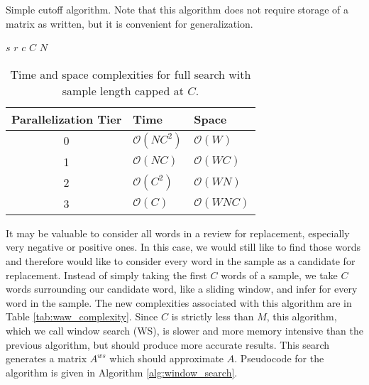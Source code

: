 \begin{algorithm}
\begin{algorithmic}[1]
\begin{spacing}{1.0}
    \caption{Simple cutoff algorithm.  Note that this algorithm does not require storage of a matrix as written, but it is convenient for generalization.}
    \Require $s$ 
    \Require $r$ 
    \Require $c$ 
    \Require $C$ 
    \Require $N$ 
            \EndIf
            \EndIf
        \EndFor
    \EndFor\\
\label{alg:cutoff}
\end{spacing}
\end{algorithmic}
\end{algorithm}

\begin{table}
\centering
\begin{tabular}{ |c|l|l| } 
 \hline
 Parallelization Tier & Time & Space \\ \hline
 0&$\mathcal{O}(NC^2)$ & $\mathcal{O}(W)$ \\ %
 1&$\mathcal{O}(NC)$ & $\mathcal{O}(WC)$ \\ %
 2&$\mathcal{O}(C^2)$ & $\mathcal{O}(WN)$ \\%
 3&$\mathcal{O}(C)$ & $\mathcal{O}(WNC)$ \\ \hline
\end{tabular}
\caption{Time and space complexities for full search with sample length capped at $C$.}
\label{tab:wa_complexity}
\end{table}

It may be valuable to consider all words in a review for replacement, especially very negative or positive ones.  In this case, we would still like to find those words and therefore would like to consider every word in the sample as a candidate for replacement.  Instead of simply taking the first $C$ words of a sample, we take $C$ words surrounding our candidate word, like a sliding window, and infer for every word in the sample.  The new complexities associated with this algorithm are in Table \ref{tab:waw_complexity}.  Since $C$ is strictly less than $M$, this algorithm, which we call window search (WS), is slower and more memory intensive than the previous algorithm, but should produce more accurate results.  This search generates a matrix $A^{ws}$ which should approximate $A$.  Pseudocode for the algorithm is given in Algorithm \ref{alg:window_search}.

